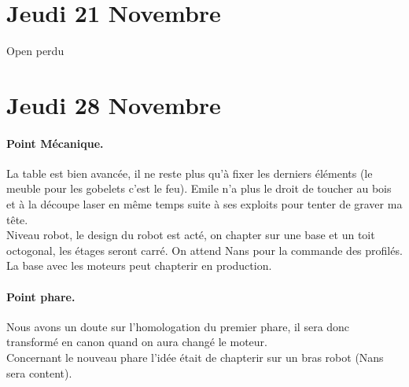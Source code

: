 \documentclass[a4paper,10pt]{report}
\begin{document}
\begin{spacing}{1.5}
\newpage
\section*{Jeudi 21 Novembre}
Open perdu

\newpage
\section*{Jeudi 28 Novembre}
\paragraph*{Point Mécanique.}
La table est bien avancée, il ne reste plus qu'à fixer les derniers éléments (le
meuble pour les gobelets c'est le feu). Emile n'a plus le droit de toucher au
bois et à la découpe laser en même temps suite à ses exploits pour tenter de
graver ma tête. \\
Niveau robot, le design du robot est acté, on chapter sur une base et un toit
octogonal, les étages seront carré. On attend Nans pour la commande des
profilés. La base avec les moteurs peut chapterir en production.

\paragraph*{Point phare.}
\label{sec:phare}
Nous avons un doute sur l'homologation du premier phare, il sera donc transformé
en canon quand on aura changé le moteur. \\
Concernant le nouveau phare l'idée était de chapterir sur un bras robot (Nans sera
content).


\end{spacing}
\end{document}
